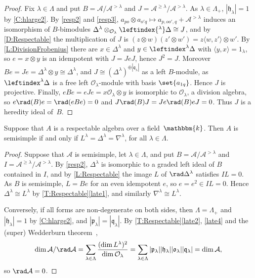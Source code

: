 \documentclass[a4paper,11pt]{amsart}
\let\<\langle
\let\>\rangle
\numberwithin{equation}{subsection}
\theoremstyle{definition}
\theoremstyle{theorem}
\theoremstyle{remark}
\newcommand\CO{\mathcal{O}}
\newcommand\plam[1][\lambda]{\mathfrak{p}_{#1}}
\newcommand\hlam[1][\lambda]{\mathfrak{h}_{#1}}
\newcommand\qlam[1][\lambda]{\mathfrak{q}_{#1}}
\newcommand\Olam[1][\lambda]{\CO_{#1}}
\newcommand\olam[1][\lambda]{\mathfrak{o}_{#1}}
\newcommand\kk{\mathbbm{k}}
\begin{document}
\begin{proof}
  Fix $\lambda\in\Lambda$ and put $B=\mathcal{A}/\mathcal{A}^{>\lambda}$ and $J=\mathcal{A}^{\ge\lambda}/\mathcal{A}^{>\lambda}$. As $\lambda\in\Lambda_+$, $|\hlam|=1$ by \autoref{C:hlarge2}. By \autoref{resp2} and \autoref{resp3}, $a_{po}\otimes a_{o'q}\mapsto a_{p,oo',q}+\mathcal{A}^{>\lambda}$ induces an isomorphism of $B$-bimodules $\Delta^\lambda\otimes_{\Olam}\leftindex{^\lambda}\Delta\cong J$, and by \autoref{D:Respectable} the multiplication of $J$ is $(z\otimes w)(z'\otimes w')=z\<w,z'\>\otimes w'$. By \autoref{L:DivisionFrobenius} there are $x\in\Delta^\lambda$ and $y\in\leftindex^{\lambda}\Delta$ with $\<y,x\>=1_\lambda$, so $e=x\otimes y$ is an idempotent with $J=JeJ$, hence $J^2=J$. Moreover $Be=Je=\Delta^\lambda\otimes y\cong\Delta^\lambda$, and $J\cong(\Delta^\lambda)^{\oplus|\qlam|}$ as a left $B$-module, as $\leftindex^{\lambda}\Delta$ is a free left $\Olam$-module with basis $\set{a_{1q}}$. Hence $J$ is projective. Finally, $eBe=eJe=x\Olam\otimes y$ is isomorphic to $\Olam$, a division algebra, so $e\rad(B)e=\rad(eBe)=0$ and $J\rad(B)J=Je\rad(B)eJ=0$. Thus $J$ is a heredity ideal of~$B$.
\end{proof}

\begin{Corollary}\label{C:Semisimple}
    Suppose that $A$ is a respectable algebra over a field~$\kk$. Then
    $A$ is semisimple if and only if $L^\lambda=\Delta^\lambda=\nabla^\lambda$, for all
    $\lambda\in\Lambda$.
\end{Corollary}

  \begin{proof}
  Suppose that $\mathcal{A}$ is semisimple, let $\lambda\in\Lambda$, and put $B=\mathcal{A}/\mathcal{A}^{>\lambda}$ and $I=\mathcal{A}^{\ge\lambda}/\mathcal{A}^{>\lambda}$. By \autoref{resp2}, $\Delta^\lambda$ is isomorphic to a graded left ideal of $B$ contained in $I$, and by \autoref{L:Respectable} the image $L$ of $\rad\Delta^\lambda$ satisfies $IL=0$. As $B$ is semisimple, $L=Be$ for an even idempotent $e$, so $e=e^2\in IL=0$. Hence $\Delta^\lambda\cong L^\lambda$ by \autoref{T:Respectable}\autoref{late1}, and similarly $\nabla^\lambda\cong L^\lambda$.

  Conversely, if all forms are non-degenerate on both sides, then
  $\Lambda=\Lambda_+$ and $|\hlam|=1$ by \autoref{C:hlarge2}, and
  $|\plam|=|\qlam|$. By \autoref{T:Respectable}\autoref{late2}, \autoref{late4} and the (super) Wedderburn
  theorem~\cite[Theorem~12.2.9]{Kleshchevbook},
  \[
    \dim\mathcal{A}/\rad\mathcal{A}=\sum_{\lambda\in\Lambda}\frac{(\dim L^\lambda)^2}{\dim\Olam}=\sum_{\lambda\in\Lambda}|\plam||\hlam||\olam||\qlam|=\dim\mathcal{A},
  \]
  so $\rad\mathcal{A}=0$.
  \end{proof}
\end{document}
